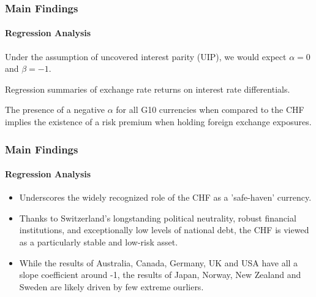 \documentclass[10pt]{beamer}
\begin{document}
\begin{frame}
\frametitle{Main Findings}
\framesubtitle{Regression Analysis}
Under the assumption of uncovered interest parity (UIP), we would expect $\alpha=0$ and $\beta=-1$.
\begin{table}[h]
\centering
\caption{\footnotesize Regression summaries of exchange rate returns on interest rate differentials.} 
\label{tab:var_results}
\end{table}
The presence of a negative $\alpha$ for all G10 currencies when compared to the CHF implies the existence of a risk premium when holding foreign exchange exposures.
\end{frame}
\begin{frame}
\frametitle{Main Findings}
\framesubtitle{Regression Analysis}
\begin{itemize}
    \item Underscores the widely recognized role of the CHF as a ’safe-haven’ currency. 
    \item Thanks to Switzerland’s longstanding political neutrality, robust financial institutions, and exceptionally low levels of national debt, the CHF is viewed as a particularly stable and low-risk asset.
    \item While the results of Australia, Canada, Germany, UK and USA have all a slope coefficient around -1, the results of Japan, Norway, New Zealand and Sweden are likely driven by few extreme ourliers.
\end{itemize}
\end{frame}
\end{document}

